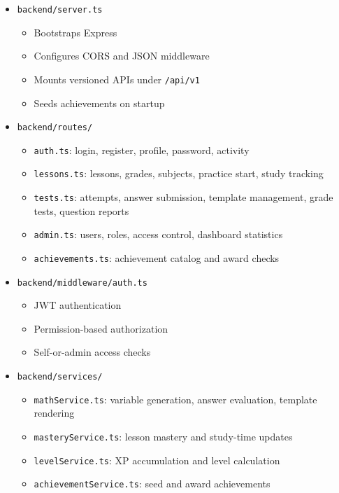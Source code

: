 \documentclass[11pt,a4paper]{article}
\newcommand{\docpath}[1]{\texttt{#1}}
\begin{document}
\begin{itemize}[leftmargin=1.5em]
  \item \docpath{backend/server.ts}
  \begin{itemize}[leftmargin=2em]
    \item Bootstraps Express
    \item Configures CORS and JSON middleware
    \item Mounts versioned APIs under \docpath{/api/v1}
    \item Seeds achievements on startup
  \end{itemize}
  \item \docpath{backend/routes/}
  \begin{itemize}[leftmargin=2em]
    \item \docpath{auth.ts}: login, register, profile, password, activity
    \item \docpath{lessons.ts}: lessons, grades, subjects, practice start, study tracking
    \item \docpath{tests.ts}: attempts, answer submission, template management, grade tests, question reports
    \item \docpath{admin.ts}: users, roles, access control, dashboard statistics
    \item \docpath{achievements.ts}: achievement catalog and award checks
  \end{itemize}
  \item \docpath{backend/middleware/auth.ts}
  \begin{itemize}[leftmargin=2em]
    \item JWT authentication
    \item Permission-based authorization
    \item Self-or-admin access checks
  \end{itemize}
  \item \docpath{backend/services/}
  \begin{itemize}[leftmargin=2em]
    \item \docpath{mathService.ts}: variable generation, answer evaluation, template rendering
    \item \docpath{masteryService.ts}: lesson mastery and study-time updates
    \item \docpath{levelService.ts}: XP accumulation and level calculation
    \item \docpath{achievementService.ts}: seed and award achievements
  \end{itemize}
\end{itemize}
\end{document}
